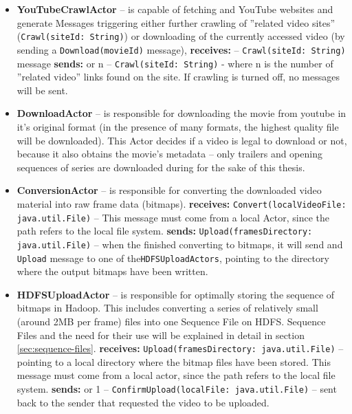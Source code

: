 \begin{itemize}
  \item \textbf{YouTubeCrawlActor} -- is capable of fetching and YouTube websites and generate Messages triggering
                                    either further crawling of ''related video sites'' (\verb|Crawl(siteId: String)|) or downloading of the 
                                    currently accessed video (by sending a \verb|Download(movieId)| message),
    \subitem  \textbf{receives:}
       -- \verb|Crawl(siteId: String)| message
    \subitem  \textbf{sends:}
       or n -- \verb|Crawl(siteId: String)| - where n is the number of ''related video'' links found on the site. 
                                                           If crawling is turned off, no messages will be sent.

  \item \textbf{DownloadActor} -- is responsible for downloading the movie from youtube in it's original format (in the presence of many formats, 
                                the highest quality file will be downloaded). This Actor decides if a video is legal to download or not, because it also
                                obtains the movie's metadata -- only trailers and opening sequences of series are downloaded during for the sake of this 
                                thesis.
                                
  \item \textbf{ConversionActor} -- is responsible for converting the downloaded video material into raw frame data (bitmaps).
    \subitem  \textbf{receives:}
      \subsubitem \verb|Convert(localVideoFile: java.util.File)| -- This message must come from a local Actor, since the path refers to the local file system.
    \subitem  \textbf{sends:}
      \subsubitem \verb|Upload(framesDirectory: java.util.File)| -- when the finished converting to bitmaps, it will send and \verb|Upload| message to one of the\verb|HDFSUploadActors|, pointing to the directory where the output bitmaps have been written.
                                                                    
  \item \textbf{HDFSUploadActor} -- is responsible for optimally storing the sequence of bitmaps in Hadoop. This includes converting a series of 
                                  relatively small (around 2MB per frame) files into one Sequence File on HDFS. Sequence Files and the need for their use
                                  will be explained in detail in section \ref{sec:sequence-files}.
  \subitem \textbf{receives:}
    \subsubitem \verb|Upload(framesDirectory: java.util.File)| -- pointing to a local directory where the bitmap files have been stored.
                                                                 This message must come from a local actor, since the path refers to the local file system.
    \subitem  \textbf{sends:}
       or 1 -- \verb|ConfirmUpload(localFile: java.util.File)| -- sent back to the sender that requested the video to be uploaded.
\end{itemize}

